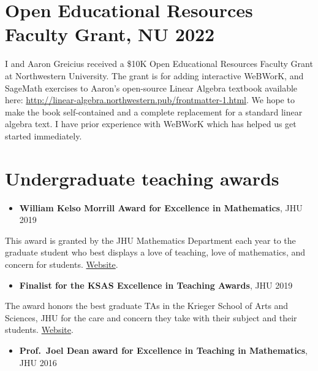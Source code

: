 \documentclass[
]{report}
\providecommand{\tightlist}{%
  \setlength{\itemsep}{0pt}\setlength{\parskip}{0pt}}
\begin{document}
\hypertarget{open-educational-resources-faculty-grant-nu-2022}{%
\section{Open Educational Resources Faculty Grant, NU 2022}\label{open-educational-resources-faculty-grant-nu-2022}}

I and Aaron Greicius received a \$10K Open Educational Resources Faculty Grant at Northwestern University.
The grant is for adding interactive WeBWorK, and SageMath exercises to Aaron's open-source Linear Algebra textbook available here: \url{http://linear-algebra.northwestern.pub/frontmatter-1.html}.
We hope to make the book self-contained and a complete replacement for a standard linear algebra text.
I have prior experience with WeBWorK which has helped us get started immediately.

\hypertarget{undergraduate-teaching-awards}{%
\section{Undergraduate teaching awards}\label{undergraduate-teaching-awards}}

\begin{itemize}
\tightlist
\item
  \textbf{William Kelso Morrill Award for Excellence in Mathematics}, JHU 2019
\end{itemize}

This award is granted by the JHU Mathematics Department each year to the graduate student who best displays a love of teaching, love of mathematics, and concern for students.
\href{https://sites.krieger.jhu.edu/math-intranet/for-graduate-students/graduate-awards/}{Website}.

\begin{itemize}
\tightlist
\item
  \textbf{Finalist for the KSAS Excellence in Teaching Awards}, JHU 2019
\end{itemize}

The award honors the best graduate TAs in the Krieger School of Arts and Sciences, JHU for the care and concern they take with their subject and their students.
\href{https://krieger.jhu.edu/teaching-award/}{Website}.

\begin{itemize}
\tightlist
\item
  \textbf{Prof.~Joel Dean award for Excellence in Teaching in Mathematics}, JHU 2016
\end{itemize}
\end{document}
